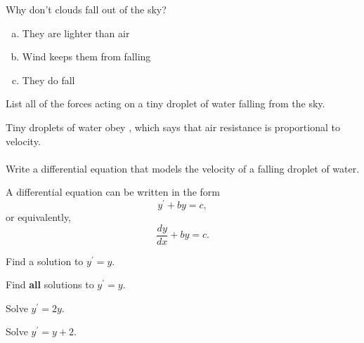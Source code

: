 
\begin{applicationActivities}




\begin{activity}{5}
Why don't clouds fall out of the sky?
\begin{enumerate}[(a)]
\item They are lighter than air
\item Wind keeps them from falling
\item They do fall
\end{enumerate}
\end{activity}

\begin{activity}{5}
List all of the forces acting on a tiny droplet of water falling from the sky.
\end{activity}

\begin{activity}{5}
Tiny droplets of water obey , which says that air resistance is proportional to velocity.
\\~\\
Write a differential equation that models the velocity of a falling droplet of water.  
\end{activity}


\begin{definition}
A  differential equation can be written in the form
\[y^\prime+by=c,\]
or equivalently,
\[\frac{dy}{dx} +by=c.\]
\end{definition}

\begin{activity}{5}
Find a solution to \(y^{\prime}=y\).
\end{activity}

\begin{activity}{5}
Find {\bf all} solutions to \(y^{\prime}=y\).
\end{activity}

\begin{activity}{5}
Solve \(y^{\prime}=2y\).
\end{activity}

\begin{activity}{5}
Solve \(y^{\prime}=y+2\).
\end{activity}



\end{applicationActivities}
